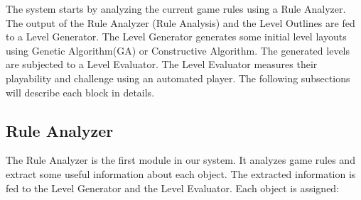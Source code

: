 \documentclass[letterpaper]{article}
\begin{document}
The system starts by analyzing the current game rules using a Rule Analyzer. The output of the Rule Analyzer (Rule Analysis) and the Level Outlines are fed to a Level Generator. The Level Generator generates some initial level layouts using Genetic Algorithm(GA) or Constructive Algorithm. The generated levels are subjected to a Level Evaluator. The Level Evaluator measures their playability and challenge using an automated player. The following subsections will describe each block in details.

\subsection{Rule Analyzer}
The Rule Analyzer is the first module in our system. It analyzes game rules and extract some useful information about each object. The extracted information is fed to the Level Generator and the Level Evaluator. Each object is assigned:
\end{document}
